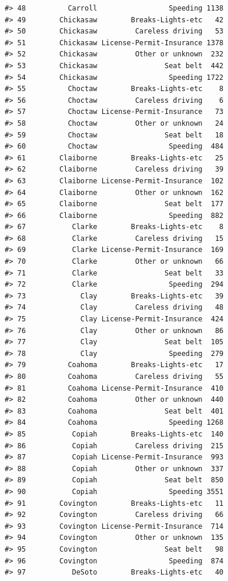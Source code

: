 \documentclass[
]{book}
\begin{document}
\begin{verbatim}
#> 48          Carroll                 Speeding 1138
#> 49        Chickasaw        Breaks-Lights-etc   42
#> 50        Chickasaw         Careless driving   53
#> 51        Chickasaw License-Permit-Insurance 1378
#> 52        Chickasaw         Other or unknown  232
#> 53        Chickasaw                Seat belt  442
#> 54        Chickasaw                 Speeding 1722
#> 55          Choctaw        Breaks-Lights-etc    8
#> 56          Choctaw         Careless driving    6
#> 57          Choctaw License-Permit-Insurance   73
#> 58          Choctaw         Other or unknown   24
#> 59          Choctaw                Seat belt   18
#> 60          Choctaw                 Speeding  484
#> 61        Claiborne        Breaks-Lights-etc   25
#> 62        Claiborne         Careless driving   39
#> 63        Claiborne License-Permit-Insurance  102
#> 64        Claiborne         Other or unknown  162
#> 65        Claiborne                Seat belt  177
#> 66        Claiborne                 Speeding  882
#> 67           Clarke        Breaks-Lights-etc    8
#> 68           Clarke         Careless driving   15
#> 69           Clarke License-Permit-Insurance  169
#> 70           Clarke         Other or unknown   66
#> 71           Clarke                Seat belt   33
#> 72           Clarke                 Speeding  294
#> 73             Clay        Breaks-Lights-etc   39
#> 74             Clay         Careless driving   48
#> 75             Clay License-Permit-Insurance  424
#> 76             Clay         Other or unknown   86
#> 77             Clay                Seat belt  105
#> 78             Clay                 Speeding  279
#> 79          Coahoma        Breaks-Lights-etc   17
#> 80          Coahoma         Careless driving   55
#> 81          Coahoma License-Permit-Insurance  410
#> 82          Coahoma         Other or unknown  440
#> 83          Coahoma                Seat belt  401
#> 84          Coahoma                 Speeding 1268
#> 85           Copiah        Breaks-Lights-etc  140
#> 86           Copiah         Careless driving  215
#> 87           Copiah License-Permit-Insurance  993
#> 88           Copiah         Other or unknown  337
#> 89           Copiah                Seat belt  850
#> 90           Copiah                 Speeding 3551
#> 91        Covington        Breaks-Lights-etc   11
#> 92        Covington         Careless driving   66
#> 93        Covington License-Permit-Insurance  714
#> 94        Covington         Other or unknown  135
#> 95        Covington                Seat belt   98
#> 96        Covington                 Speeding  874
#> 97           DeSoto        Breaks-Lights-etc   40

\end{verbatim}
\end{document}
